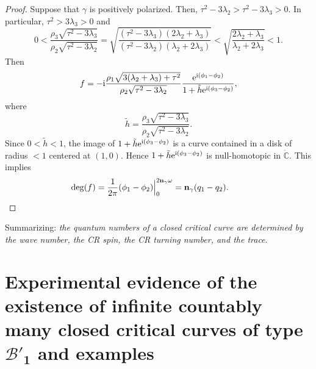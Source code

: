 \documentclass[pdftex]{sigma}
\numberwithin{equation}{section}
\def\C{\mathbb{C}}
\begin{document}
\begin{proof}
Suppose that $\gamma$ is
positively
polarized. Then, $\tau^2-3\lambda_2>\tau^2-3\lambda_3>0$. In particular, $\tau^2>3\lambda_3>0$ and
\[
0<\frac{\rho_3\sqrt{\tau^2-3\lambda_3}}{\rho_2\sqrt{\tau^2-3\lambda_2}}
=\sqrt{\frac{(\tau^2-3\lambda_3)(2\lambda_2+\lambda_3)}{(\tau^2-3\lambda_2)(\lambda_2+2\lambda_3)}}
< \sqrt{
\frac{2\lambda_2+\lambda_3}
{\lambda_2+2\lambda_3}}<1.
\]
Then
\[
 f= -{\rm i}\frac{\rho_1\sqrt{3(\lambda_2 + \lambda_3)+\tau^2}}{\rho_2\sqrt{\tau^2-3\lambda_2}}\frac{{\rm e}^{{\rm i}(\phi_1-\phi_2)}}{1+\tilde{h} {\rm e}^{{\rm i}(\phi_3-\phi_2)}},
\]
where
\[
 \tilde{h} =\frac{\rho_3\sqrt{\tau^2-3\lambda_3}}{\rho_2\sqrt{\tau^2-3\lambda_2}}.
\]
Since $0<\tilde{h}<1$, the image of $1+\tilde{h}{\rm e}^{{\rm i}(\phi_3-\phi_2)}$
is a curve contained in a disk of radius $<1$ centered at $(1,0)$.
Hence $1+\tilde{h}{\rm e}^{{\rm i}(\phi_3-\phi_2)}$
is null-homotopic in $\dot{\C}$.
This implies
\[
 \deg (f)=\frac{1}{2\pi} (\phi_1-\phi_2)\Big|_0^{2{\bf n}_{\gamma}\omega} = {\bf n}_{\gamma}(q_1-q_2).\tag*{\qed}
\]\renewcommand{\qed}{}
\end{proof}

Summarizing: \emph{the quantum numbers of a closed critical curve are determined by the wave number,
the CR spin, the CR turning number, and the trace}.

\section[Experimental evidence of the existence of infinite countably many closed
 critical curves of type B'\_1 and examples]{Experimental evidence of the existence of infinite countably\\ many closed
 critical curves of type $\boldsymbol{{\mathcal B}'_1}$ and examples}\label{s:heuristic}
\end{document}
